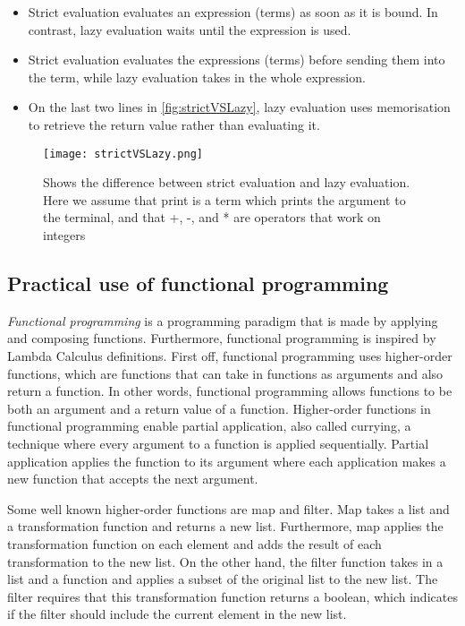 \begin{itemize}
    \item Strict evaluation evaluates an expression (terms) as soon as it is bound. In contrast, lazy evaluation waits until the expression is used.
    \item Strict evaluation evaluates the expressions (terms) before sending them into the term, while lazy evaluation takes in the whole expression.
    \item On the last two lines in \autoref{fig:strictVSLazy}, lazy evaluation uses memorisation to retrieve the return value rather than evaluating it.
\end{itemize}


\begin{figure}
    \centering
    \texttt{[image: strictVSLazy.png]}
    \caption{Shows the difference between strict evaluation and lazy evaluation. Here we assume that print is a term which prints the argument to the terminal, and that +, -, and * are operators that work on integers}
    \label{fig:strictVSLazy}
\end{figure}

\subsection{Practical use of functional programming}
\label{Practical FP}
\emph{Functional programming} is a programming paradigm that is made by applying and composing functions. Furthermore, functional programming is inspired by Lambda Calculus definitions. First off, functional programming uses higher-order functions, which are functions that can take in functions as arguments and also return a function. In other words, functional programming allows functions to be both an argument and a return value of a function. Higher-order functions in functional programming enable partial application, also called currying, a technique where every argument to a function is applied sequentially. Partial application applies the function to its argument where each application makes a new function that accepts the next argument.

\para
Some well known higher-order functions are map and filter. Map takes a list and a transformation function and returns a new list. Furthermore, map applies the transformation function on each element and adds the result of each transformation to the new list. On the other hand, the filter function takes in a list and a function and applies a subset of the original list to the new list. The filter requires that this transformation function returns a boolean, which indicates if the filter should include the current element in the new list.

